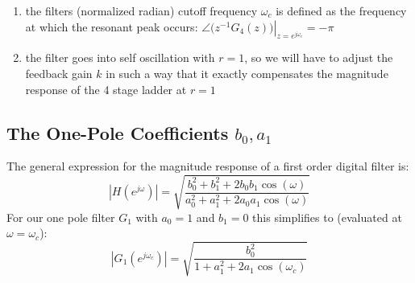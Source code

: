 \begin{enumerate}
	\item the filters (normalized radian) cutoff frequency $\omega_c$ is defined as the frequency at which the resonant peak occurs: $\left. \angle \big( z^{-1} G_4(z) \big) \right|_{z=e^{j \omega_c}} = -\pi$
	\item the filter goes into self oscillation with $r=1$, so we will have to adjust the feedback gain $k$ in such a way that it exactly compensates the magnitude response of the 4 stage ladder at $r=1$
\end{enumerate}

\subsection{The One-Pole Coefficients $b_0, a_1$}
The general expression for the magnitude response of a first order digital filter is:
\begin{equation}
 |H(e^{j \omega})| = \sqrt{\frac{b_0^2 + b_1^2 + 2 b_0 b_1 \cos (\omega)}{a_0^2 + a_1^2 + 2 a_0 a_1 \cos (\omega)}}
\end{equation}
For our one pole filter $G_1$ with $a_0=1$ and $b_1 = 0$ this simplifies to (evaluated at $\omega=\omega_c$):
\begin{equation}
 |G_1(e^{j \omega_c})| = \sqrt{\frac{b_0^2}{1 + a_1^2 + 2 a_1 \cos (\omega_c)}}
\end{equation}

